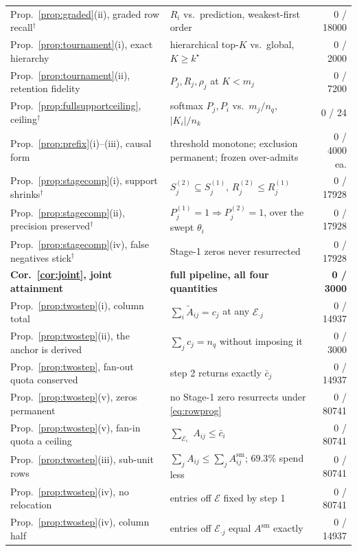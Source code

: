 \documentclass{article}
\begin{document}
\begin{table}[h]
\begin{tabular}{@{}llr@{}}
Prop.~\ref{prop:graded}(ii), graded row recall$^{\dagger}$ & $R_i$ vs.\ prediction, weakest-first order & 0 / 18000 \\
Prop.~\ref{prop:tournament}(i), exact hierarchy & hierarchical top-$K$ vs.\ global, $K \ge k^\star$ & 0 / 2000 \\
Prop.~\ref{prop:tournament}(ii), retention fidelity & $P_j,R_j,\rho_j$ at $K<m_j$ & 0 / 7200 \\
Prop.~\ref{prop:fullsupportceiling}, ceiling$^{\dagger}$ & softmax $P_j,P_i$ vs.\ $m_j/n_q$, $|K_i|/n_k$ & 0 / 24 \\
Prop.~\ref{prop:prefix}(i)--(iii), causal form & threshold monotone; exclusion permanent; frozen over-admits & 0 / 4000 ea. \\
Prop.~\ref{prop:stagecomp}(i), support shrinks$^{\dagger}$ & $S_j^{(2)}\!\subseteq\! S_j^{(1)}$, $R_j^{(2)}\!\le\! R_j^{(1)}$ & 0 / 17928 \\
Prop.~\ref{prop:stagecomp}(ii), precision preserved$^{\dagger}$ & $P_j^{(1)}\!=\!1 \Rightarrow P_j^{(2)}\!=\!1$, over the swept $\theta_i$ & 0 / 17928 \\
Prop.~\ref{prop:stagecomp}(iv), false negatives stick$^{\dagger}$ & Stage-1 zeros never resurrected & 0 / 17928 \\
\textbf{Cor.~\ref{cor:joint}, joint attainment} & \textbf{full pipeline, all four quantities} & \textbf{0 / 3000} \\
\addlinespace
Prop.~\ref{prop:twostep}(i), column total & $\sum_i\tilde A_{ij}=c_j$ at any $\mathcal{E}_{\cdot j}$ & 0 / 14937 \\
Prop.~\ref{prop:twostep}(ii), the anchor is derived & $\sum_j c_j = n_q$ without imposing it & 0 / 3000 \\
Prop.~\ref{prop:twostep}, fan-out quota conserved & step 2 returns exactly $\bar c_j$ & 0 / 14937 \\
Prop.~\ref{prop:twostep}(v), zeros permanent & no Stage-1 zero resurrects under \eqref{eq:rowprog} & 0 / 80741 \\
Prop.~\ref{prop:twostep}(v), fan-in quota a ceiling & $\sum_{\mathcal{E}_{i\cdot}}A_{ij}\le \bar c_i$ & 0 / 80741 \\
Prop.~\ref{prop:twostep}(iii), sub-unit rows & $\sum_j A_{ij}\le\sum_jA^{\mathrm{sm}}_{ij}$; $69.3\%$ spend less & 0 / 80741 \\
Prop.~\ref{prop:twostep}(iv), no relocation & entries off $\mathcal{E}$ fixed by step 1 & 0 / 80741 \\
Prop.~\ref{prop:twostep}(iv), column half & entries off $\mathcal{E}_{\cdot j}$ equal $A^{\mathrm{sm}}$ exactly & 0 / 14937 \\

\end{tabular}
\end{table}
\end{document}
